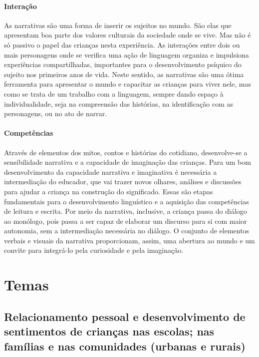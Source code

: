 \documentclass[11pt]{extarticle}
\begin{document}
\paragraph{Interação} As narrativas são uma forma de inserir os sujeitos no mundo. 
São elas que apresentam boa parte dos valores culturais da sociedade 
onde se vive. Mas não é só passivo o papel das crianças nesta experiência. 
As interações entre dois ou mais personagens onde se verifica
uma ação de linguagem organiza e impulsiona experiências compartilhadas,
importantes para o desenvolvimento psíquico do sujeito nos primeiros anos de vida.
Neste sentido, as narrativas são uma ótima ferramenta para
apresentar o mundo e capacitar as crianças para viver nele, mas como se
trata de um trabalho com a linguagem, sempre dando espaço à individualidade, 
seja na compreensão das histórias, na identificação com as personagens, ou 
no ato de narrar.

\paragraph{Competências} 
Através de elementos dos mitos, contos e histórias do cotidiano, desenvolve-se a sensibilidade narrativa e a capacidade de imaginação das crianças. Para um bom desenvolvimento da capacidade narrativa e imaginativa é necessária a intermediação do educador, que vai trazer novos olhares, análises e discussões para ajudar a criança na construção do significado. Essas são etapas fundamentais para o desenvolvimento linguístico e a aquisição das competências de leitura e escrita. Por meio da narrativa, inclusive, a criança passa do diálogo ao monólogo, pois passa a ser capaz de elaborar um discurso para si com maior autonomia, sem a intermediação necessária no diálogo.
O conjunto de elementos verbais e visuais da narrativa proporcionam, assim,
uma abertura ao mundo e um convite para integrá-lo pela curiosidade e pela imaginação.


\section{Temas}

\subsection{Relacionamento pessoal e desenvolvimento de sentimentos de crianças nas escolas; nas famílias e nas comunidades (urbanas e rurais)}
\end{document}
